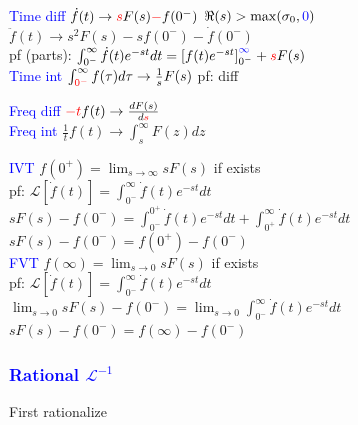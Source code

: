 \documentclass[4pt]{article}
\theoremstyle{definition}
\theoremstyle{definition}
\newcommand{\ra}{\rightarrow}
\newcommand{\ulint}{\int_{0^-}^{\infty}}    %
\newcommand{\red}[1]{\textcolor{red}{#1}}
\newcommand{\blue}[1]{\textcolor{blue}{#1}}
\begin{document}
\begin{landscape}
\begin{multicols}{3}
    \blue{Time diff} \(\dot{f}(t) \ra \red{s} F(s) \red - f(0^-)\) \hfill $\Re(s) > \max(\sigma_0, \blue 0)$\\     
            \hspace{2em} \(\ddot{f}(t) \ra s^2 F(s) - sf(0^-) - \dot{f}(0^-)\)\\  
        \hspace{1em} pf (parts): \(\ulint \dot{f}(t) e^{-st} dt = \left[f(t) e^{-st} \right]^{\blue{\infty}}_{0^-} + \red s F(s)\)\\

    \blue{Time int} \(\int_{\red{0^-}}^{\infty} f(\tau) d\tau \ra \frac{1}{s} F(s)\) \hspace{1em} pf: diff     %

    \blue{Freq diff} \(\red{-t} f(t) \ra \frac{dF(s)}{d \red s}\) \\   

    \blue{Freq int} \(\frac{1}{t}f(t) \ra \int_s^{\infty}F(z) dz\)

    \blue{IVT} \(f(0^+) = \lim_{s\ra \infty} sF(s)\)        \hfill if exists\\
        \hspace{1em} pf: \(\mathcal L[\dot{f} (t)] = \ulint \dot f(t) e^{-st} dt\)\\  
            \hspace{2em} \(sF(s) - f(0^-) = \int_{0^-}^{0^+} \dot f (t) e^{-st} dt + \int _{0^+}^{\infty} \dot f(t) e^{-st} dt \)\\    
            \hspace{2em} \(sF(s) - f(0^-) = f(0^+) - f(0^-)\)\\                         %

    \blue{FVT} \(f(\infty) = \lim_{s\ra 0} sF(s)\)          \hfill if exists\\
        \hspace{1em} pf: \(\mathcal L[\dot{f} (t)] = \ulint \dot f(t) e^{-st} dt\)\\
                \hspace{2em} \(\lim_{s\ra 0} sF(s) - f(0^-) = \lim_{s\ra 0}\ulint \dot f (t) e^{-st} dt\)\\    %
                \hspace{2em} \(sF(s) - f(0^-) = f(\infty) - f(0^-)\)                    %
\subsubsection*{\blue{Rational $\mathcal L^{-1}$}}
    First rationalize                                                                   %


\end{multicols}
\end{landscape}
\end{document}
